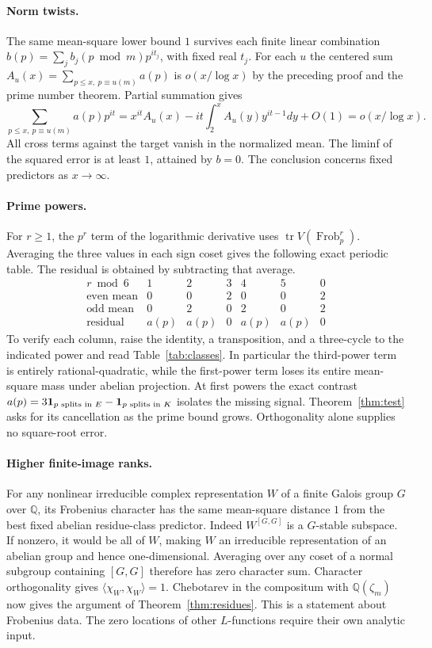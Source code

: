 \documentclass[11pt]{article}
\newcommand{\Q}{\mathbb Q}
\newcommand{\Frob}{\operatorname{Frob}}
\newcommand{\Tr}{\operatorname{tr}}
\begin{document}
\paragraph{Norm twists.}
The same mean-square lower bound \(1\) survives each finite linear
combination \(b(p)=\sum_j b_j(p\bmod m)p^{it_j}\), with fixed real \(t_j\).
For each \(u\) the centered sum \(A_u(x)=\sum_{p\le x,\ p\equiv u(m)}a(p)\)
is \(o(x/\log x)\) by the preceding proof and the prime number theorem.
Partial summation gives
\[
 \sum_{p\le x,\ p\equiv u(m)} a(p)p^{it}
 = x^{it}A_u(x)-it\int_2^x A_u(y)y^{it-1}dy+O(1)
 =o(x/\log x).
\]
All cross terms against the target vanish in the normalized mean. The
liminf of the squared error is at least \(1\), attained by \(b=0\).
The conclusion concerns fixed predictors as \(x\to\infty\).

\paragraph{Prime powers.}
For \(r\ge1\), the \(p^r\) term of the logarithmic derivative uses
\(\Tr V(\Frob_p^r)\). Averaging the three values in each sign coset
gives the following exact periodic table. The residual is obtained by
subtracting that average.
\[
\begin{array}{c|rrrrrr}
r\bmod6&1&2&3&4&5&0\\\hline
\text{even mean}&0&0&2&0&0&2\\
\text{odd mean}&0&2&0&2&0&2\\
\text{residual}&a(p)&a(p)&0&a(p)&a(p)&0
\end{array}
\]
To verify each column, raise the identity, a transposition, and a
three-cycle to the indicated power and read Table~\ref{tab:classes}.
In particular the third-power term is entirely rational-quadratic, while
the first-power term loses its entire mean-square mass under abelian
projection. At first powers the exact contrast
\(a(p)=3{\bf1}_{p\text{ splits in }E}-{\bf1}_{p\text{ splits in }K}\)
isolates the missing signal. Theorem~\ref{thm:test} asks for its
cancellation as the prime bound grows. Orthogonality alone supplies no
square-root error.

\paragraph{Higher finite-image ranks.}
For any nonlinear irreducible complex representation \(W\) of a finite
Galois group \(G\) over \(\Q\), its Frobenius character has the same
mean-square distance \(1\) from the best fixed abelian residue-class
predictor. Indeed \(W^{[G,G]}\) is a \(G\)-stable subspace. If nonzero,
it would be all of \(W\), making \(W\) an irreducible representation of
an abelian group and hence one-dimensional. Averaging over any coset of
a normal subgroup containing \([G,G]\) therefore has zero character
sum. Character orthogonality gives \(\langle\chi_W,\chi_W\rangle=1\).
Chebotarev in the compositum with \(\Q(\zeta_m)\) now gives the argument
of Theorem~\ref{thm:residues}. This is a statement about Frobenius data.
The zero locations of other \(L\)-functions require their own analytic input.
\end{document}
